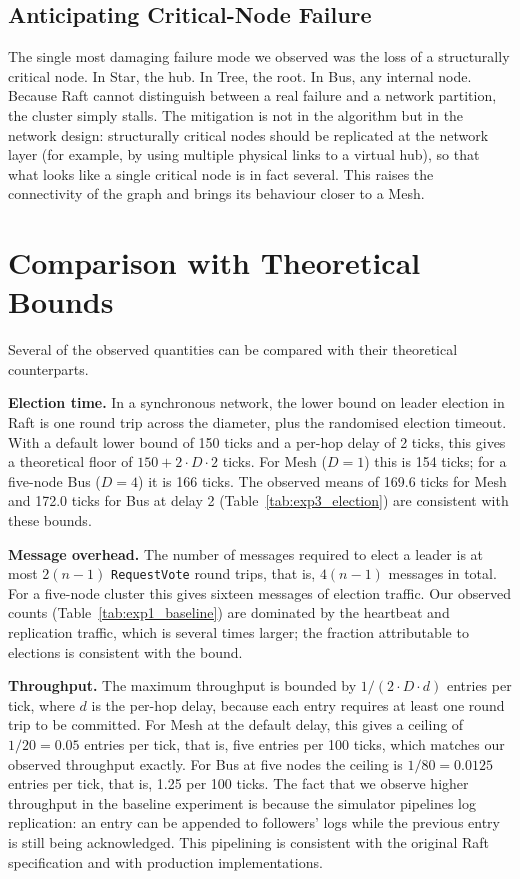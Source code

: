 \subsection{Anticipating Critical-Node Failure}

The single most damaging failure mode we observed was the loss of a structurally critical node. In Star, the hub. In Tree, the root. In Bus, any internal node. Because Raft cannot distinguish between a real failure and a network partition, the cluster simply stalls. The mitigation is not in the algorithm but in the network design: structurally critical nodes should be replicated at the network layer (for example, by using multiple physical links to a virtual hub), so that what looks like a single critical node is in fact several. This raises the connectivity of the graph and brings its behaviour closer to a Mesh.

\section{Comparison with Theoretical Bounds}

Several of the observed quantities can be compared with their theoretical counterparts.

\textbf{Election time.} In a synchronous network, the lower bound on leader election in Raft is one round trip across the diameter, plus the randomised election timeout. With a default lower bound of 150 ticks and a per-hop delay of 2 ticks, this gives a theoretical floor of $150 + 2 \cdot D \cdot 2$ ticks. For Mesh ($D=1$) this is 154 ticks; for a five-node Bus ($D=4$) it is 166 ticks. The observed means of 169.6 ticks for Mesh and 172.0 ticks for Bus at delay 2 (Table~\ref{tab:exp3_election}) are consistent with these bounds.

\textbf{Message overhead.} The number of messages required to elect a leader is at most $2(n-1)$ \texttt{RequestVote} round trips, that is, $4(n-1)$ messages in total. For a five-node cluster this gives sixteen messages of election traffic. Our observed counts (Table~\ref{tab:exp1_baseline}) are dominated by the heartbeat and replication traffic, which is several times larger; the fraction attributable to elections is consistent with the bound.

\textbf{Throughput.} The maximum throughput is bounded by $1 / (2 \cdot D \cdot d)$ entries per tick, where $d$ is the per-hop delay, because each entry requires at least one round trip to be committed. For Mesh at the default delay, this gives a ceiling of $1/20 = 0.05$ entries per tick, that is, five entries per 100 ticks, which matches our observed throughput exactly. For Bus at five nodes the ceiling is $1/80 = 0.0125$ entries per tick, that is, 1.25 per 100 ticks. The fact that we observe higher throughput in the baseline experiment is because the simulator pipelines log replication: an entry can be appended to followers' logs while the previous entry is still being acknowledged. This pipelining is consistent with the original Raft specification and with production implementations.

